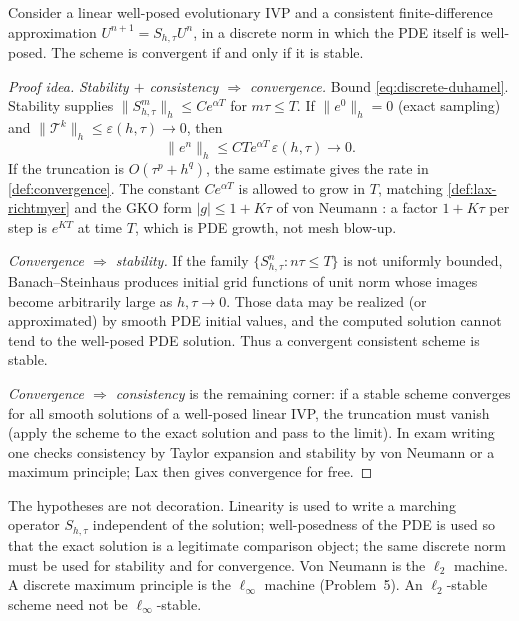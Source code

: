 \documentclass[11pt,a4paper]{article}
\begin{document}
\begin{theorem}
\label{thm:lax-eq}
Consider a linear well-posed evolutionary IVP and a consistent finite-difference approximation \(U^{n+1}=S_{h,\tau}U^n\), in a discrete norm in which the PDE itself is well-posed. The scheme is convergent if and only if it is stable.
\end{theorem}

\begin{proof}[Proof idea]
\emph{Stability \(+\) consistency \(\Rightarrow\) convergence.} Bound \eqref{eq:discrete-duhamel}. Stability supplies \(\|S_{h,\tau}^m\|_h\le C e^{\alpha T}\) for \(m\tau\le T\). If \(\|e^0\|_h=0\) (exact sampling) and \(\|\mathcal T^k\|_h\le\varepsilon(h,\tau)\to 0\), then
\[
\|e^n\|_h
\le
C T e^{\alpha T}\,\varepsilon(h,\tau)
\to 0.
\]
If the truncation is \(O(\tau^p+h^q)\), the same estimate gives the rate in \cref{def:convergence}. The constant \(C e^{\alpha T}\) is allowed to grow in \(T\), matching \cref{def:lax-richtmyer} and the GKO form \(|g|\le 1+K\tau\) of von Neumann \cite{gko95}: a factor \(1+K\tau\) per step is \(e^{KT}\) at time \(T\), which is PDE growth, not mesh blow-up.

\emph{Convergence \(\Rightarrow\) stability.} If the family \(\{S_{h,\tau}^n:n\tau\le T\}\) is not uniformly bounded, Banach--Steinhaus produces initial grid functions of unit norm whose images become arbitrarily large as \(h,\tau\to 0\). Those data may be realized (or approximated) by smooth PDE initial values, and the computed solution cannot tend to the well-posed PDE solution. Thus a convergent consistent scheme is stable.

\emph{Convergence \(\Rightarrow\) consistency} is the remaining corner: if a stable scheme converges for all smooth solutions of a well-posed linear IVP, the truncation must vanish (apply the scheme to the exact solution and pass to the limit). In exam writing one checks consistency by Taylor expansion and stability by von Neumann or a maximum principle; Lax then gives convergence for free.
\end{proof}

The hypotheses are not decoration. Linearity is used to write a marching operator \(S_{h,\tau}\) independent of the solution; well-posedness of the PDE is used so that the exact solution is a legitimate comparison object; the same discrete norm must be used for stability and for convergence. Von Neumann is the \(\ell_2\) machine. A discrete maximum principle is the \(\ell_\infty\) machine (Problem~5). An \(\ell_2\)-stable scheme need not be \(\ell_\infty\)-stable.
\end{document}
